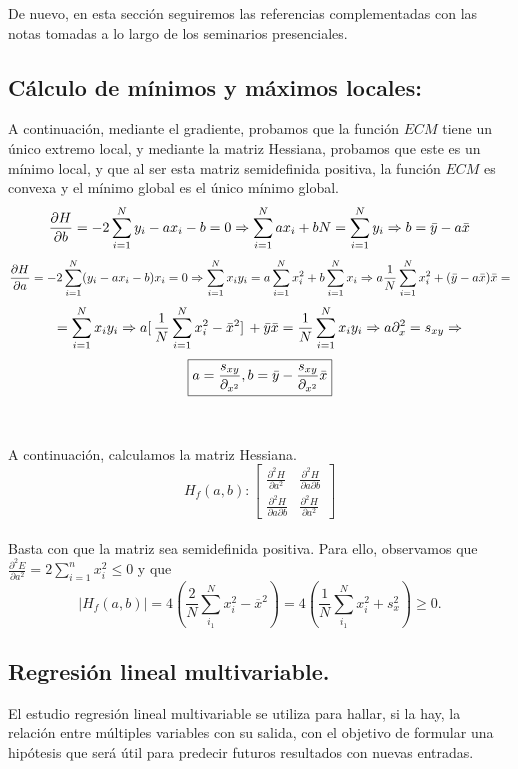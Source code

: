 \documentclass[a4paper,11pt]{article}
\begin{document}
\noindent
De nuevo, en esta sección seguiremos las referencias \cite{cálculo} \cite{cálculo2} complementadas con las notas tomadas a lo largo de los seminarios presenciales.

\subsection{Cálculo de mínimos y máximos locales:}
A continuación, mediante el gradiente, probamos que la función $ECM$ tiene
un único extremo local, y mediante la matriz Hessiana, probamos que este es un
mínimo local, y que al ser esta matriz semidefinida positiva, la función $ECM$ es
convexa y el mínimo global es el único mínimo global.
\[\frac{\partial{H}}{\partial{b}}=-2\sum_{i=1}^{N}y_{i}-ax_{i}-b=0\Rightarrow \sum_{i=1}^{N}ax_{i}+bN=\sum_{i=1}^{N}y_{i}\Rightarrow b=\Bar{y}-a\Bar{x}\]
\[\frac{\partial{H}}{\partial{a}}=-2\sum_{i=1}^{N}(y_{i}-ax_{i}-b)x_{i}=0\Rightarrow \sum_{i=1}^{N}x_{i}y_{i}=a\sum_{i=1}^{N}x_{i}^2+b\sum_{i=1}^{N}x_{i}\Rightarrow a \frac{1}{N}\sum_{i=1}^{N}x_{i}^2+(\Bar{y}-a\Bar{x})\Bar{x}=\] 
\[=\sum_{i=1}^{N}x_{i}y_{i}\Rightarrow a[ \,\frac{1}{N} \sum_{i=1}^{N} x_{i}^2-\Bar{x}^2] \,+\Bar{y}\Bar{x}=\frac{1}{N}\sum_{i=1}^{N}x_{i}y_{i}\Rightarrow a\partial_x^2=s_{xy}\Rightarrow\]
\[\boxed{a=\frac{s_{xy}}{\partial_{x^2}}, b=\Bar{y}-\frac{s_{xy}}{\partial_{x^2}}\Bar{x}}\]
\\
\\A continuación, calculamos la matriz Hessiana.\\

\[
H_f(a,b): 
\begin{bmatrix}
    \frac{\partial^2 H}{\partial a^2} & \frac{\partial^2 H}{\partial a \partial b} \\
    \frac{\partial^2 H}{\partial a \partial b} & \frac{\partial^2 H}{\partial a^2}
\end{bmatrix} \]
\\

\noindent
Basta con que la matriz sea semidefinida positiva. Para ello, observamos que $\frac{\partial^2 E}{\partial a^2}= 2 \sum_{i=1}^n x_{i}^2\leq 0$ y que\\
$$
|H_f(a,b)|=4\left(\frac{2}{N}\sum_{i_1}^N x_i^2-\overline{x}^2\right)=4\left(\frac{1}{N}\sum_{i_1}^N x_i^2+s_x^2\right)\geq 0.
$$
\subsection{Regresión lineal multivariable.}

El estudio regresión lineal multivariable se utiliza para hallar, si la hay, la relación entre múltiples variables con su salida, con el objetivo de formular una hipótesis que será útil para predecir futuros resultados con nuevas entradas. \\
\end{document}
